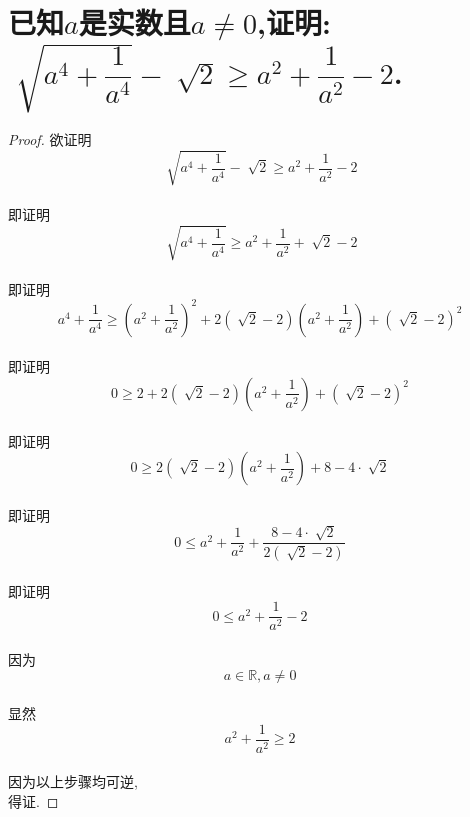 \documentclass{article}
\newcommand{\1}{\underline{\makebox[1cm]{}}}
\newcommand{\2}{\underline{\makebox[2cm]{}}}
\newcommand{\3}{\underline{\makebox[3cm]{}}}
\newcommand{\4}{\underline{\makebox[4cm]{}}}
\newlength{\la}
\begin{document}
\section{已知$a$是实数且$a \neq 0$,证明: $\sqrt[]{a^4+\dfrac{1}{a^4}} - \sqrt[]{2} \geq a^2+\dfrac{1}{a^2}-2$.}
    {\large
        \begin{proof}
        欲证明$$\sqrt[]{a^4+\dfrac{1}{a^4}}-\sqrt[]{2} \geq a^2+\dfrac{1}{a^2}-2$$\\
        即证明$$\sqrt[]{a^4+\dfrac{1}{a^4}} \geq a^2+\dfrac{1}{a^2} + \sqrt[]{2} - 2$$\\
        即证明$$a^4+\dfrac{1}{a^4} \geq {(a^2+\dfrac{1}{a^2})}^2 + 2(\sqrt[]{2} - 2)(a^2+\dfrac{1}{a^2})+{(\sqrt[]{2} - 2)}^2$$\\
        即证明$$0 \geq 2 + 2(\sqrt[]{2} - 2)(a^2+\dfrac{1}{a^2}) + {(\sqrt[]{2} - 2)}^2$$\\
        即证明$$0 \geq 2(\sqrt[]{2} - 2)(a^2+\dfrac{1}{a^2})+8 - 4\cdot \sqrt[]{2}$$\\
        即证明$$0 \leq a^2+\dfrac{1}{a^2} + \dfrac{8 - 4\cdot \sqrt[]{2}}{2(\sqrt[]{2} - 2)}$$\\
        即证明$$0 \leq a^2+\dfrac{1}{a^2} - 2$$\\
        因为$$a \in \mathbb{R}, a \neq 0$$\\
        显然$$a^2+\dfrac{1}{a^2} \geq 2$$\\
        因为以上步骤均可逆,\\
        得证.

        \end{proof}
    }
\newpage
\end{document}
